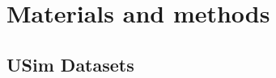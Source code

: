 \documentclass[11pt]{article}
\begin{document}
\section{Materials and methods\label{sec:mandm}}


\subsection{USim Datasets \label{sec:datasets}}
\end{document}
